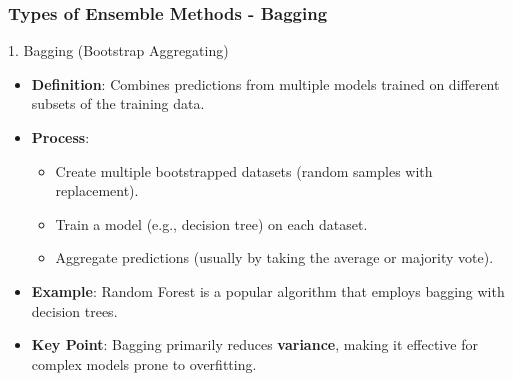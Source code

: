 \documentclass[aspectratio=169]{beamer}
\begin{document}
\begin{frame}[fragile]
  \frametitle{Types of Ensemble Methods - Bagging}
  \begin{block}{1. Bagging (Bootstrap Aggregating)}
    \begin{itemize}
      \item \textbf{Definition}: Combines predictions from multiple models trained on different subsets of the training data.
      \item \textbf{Process}:
        \begin{itemize}
          \item Create multiple bootstrapped datasets (random samples with replacement).
          \item Train a model (e.g., decision tree) on each dataset.
          \item Aggregate predictions (usually by taking the average or majority vote).
        \end{itemize}
      \item \textbf{Example}: Random Forest is a popular algorithm that employs bagging with decision trees.
      \item \textbf{Key Point}: Bagging primarily reduces \textbf{variance}, making it effective for complex models prone to overfitting.
    \end{itemize}
  \end{block}
\end{frame}
\end{document}
